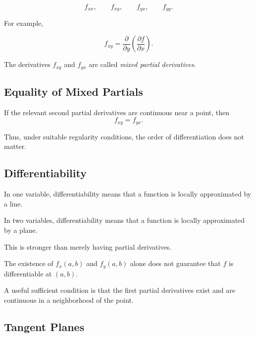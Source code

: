 \[ f_{xx},\qquad f_{xy},\qquad f_{yx},\qquad f_{yy}. \]

For example,

\[ f_{xy}
=\frac{\partial}{\partial y}
\left(\frac{\partial f}{\partial x}\right). \]

The derivatives \(f_{xy}\) and \(f_{yx}\) are called \emph{mixed partial
derivatives}.

\subsection{Equality of Mixed Partials}
\label{subsec:equality-mixed-partials}

\begin{theorem}
If the relevant second partial derivatives are continuous near a point, then
\[ f_{xy}=f_{yx}. \]
\end{theorem}

Thus, under suitable regularity conditions, the order of differentiation
does not matter.

\subsection{Differentiability}
\label{subsec:multivariable-differentiability}

In one variable, differentiability means that a function is locally
approximated by a line.

In two variables, differentiability means that a function is locally
approximated by a plane.

This is stronger than merely having partial derivatives.

\begin{warningbox}
The existence of \(f_x(a,b)\) and \(f_y(a,b)\) alone does not guarantee that
\(f\) is differentiable at \((a,b)\).
\end{warningbox}

A useful sufficient condition is that the first partial derivatives exist
and are continuous in a neighborhood of the point.

\subsection{Tangent Planes}
\label{subsec:tangent-planes}

